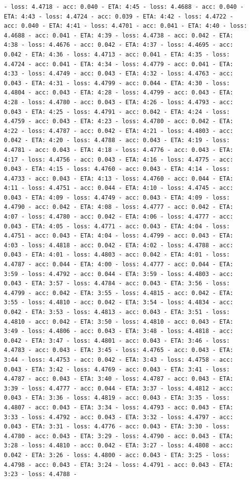 \documentclass[11pt]{article}
\begin{document}
\begin{Verbatim}[commandchars=\\\{\}]
- loss: 4.4718 - acc: 0.040 - ETA: 4:45 - loss: 4.4688 - acc: 0.040 - ETA: 4:43 - loss: 4.4724 - acc: 0.039 - ETA: 4:42 - loss: 4.4722 - acc: 0.040 - ETA: 4:41 - loss: 4.4701 - acc: 0.041 - ETA: 4:40 - loss: 4.4688 - acc: 0.041 - ETA: 4:39 - loss: 4.4738 - acc: 0.042 - ETA: 4:38 - loss: 4.4676 - acc: 0.042 - ETA: 4:37 - loss: 4.4695 - acc: 0.042 - ETA: 4:36 - loss: 4.4713 - acc: 0.041 - ETA: 4:35 - loss: 4.4724 - acc: 0.041 - ETA: 4:34 - loss: 4.4779 - acc: 0.041 - ETA: 4:33 - loss: 4.4749 - acc: 0.043 - ETA: 4:32 - loss: 4.4763 - acc: 0.043 - ETA: 4:31 - loss: 4.4799 - acc: 0.044 - ETA: 4:30 - loss: 4.4804 - acc: 0.043 - ETA: 4:28 - loss: 4.4799 - acc: 0.043 - ETA: 4:28 - loss: 4.4780 - acc: 0.043 - ETA: 4:26 - loss: 4.4793 - acc: 0.043 - ETA: 4:25 - loss: 4.4791 - acc: 0.042 - ETA: 4:24 - loss: 4.4759 - acc: 0.043 - ETA: 4:23 - loss: 4.4780 - acc: 0.042 - ETA: 4:22 - loss: 4.4787 - acc: 0.042 - ETA: 4:21 - loss: 4.4803 - acc: 0.042 - ETA: 4:20 - loss: 4.4788 - acc: 0.043 - ETA: 4:19 - loss: 4.4781 - acc: 0.043 - ETA: 4:18 - loss: 4.4776 - acc: 0.043 - ETA: 4:17 - loss: 4.4756 - acc: 0.043 - ETA: 4:16 - loss: 4.4775 - acc: 0.043 - ETA: 4:15 - loss: 4.4760 - acc: 0.043 - ETA: 4:14 - loss: 4.4733 - acc: 0.043 - ETA: 4:13 - loss: 4.4760 - acc: 0.044 - ETA: 4:11 - loss: 4.4751 - acc: 0.044 - ETA: 4:10 - loss: 4.4745 - acc: 0.043 - ETA: 4:09 - loss: 4.4749 - acc: 0.043 - ETA: 4:09 - loss: 4.4790 - acc: 0.042 - ETA: 4:08 - loss: 4.4777 - acc: 0.042 - ETA: 4:07 - loss: 4.4780 - acc: 0.042 - ETA: 4:06 - loss: 4.4777 - acc: 0.043 - ETA: 4:05 - loss: 4.4771 - acc: 0.043 - ETA: 4:04 - loss: 4.4751 - acc: 0.043 - ETA: 4:04 - loss: 4.4799 - acc: 0.043 - ETA: 4:03 - loss: 4.4818 - acc: 0.042 - ETA: 4:02 - loss: 4.4788 - acc: 0.043 - ETA: 4:01 - loss: 4.4803 - acc: 0.042 - ETA: 4:01 - loss: 4.4787 - acc: 0.044 - ETA: 4:00 - loss: 4.4777 - acc: 0.044 - ETA: 3:59 - loss: 4.4792 - acc: 0.044 - ETA: 3:59 - loss: 4.4803 - acc: 0.043 - ETA: 3:57 - loss: 4.4784 - acc: 0.043 - ETA: 3:56 - loss: 4.4799 - acc: 0.042 - ETA: 3:55 - loss: 4.4815 - acc: 0.042 - ETA: 3:55 - loss: 4.4810 - acc: 0.042 - ETA: 3:54 - loss: 4.4834 - acc: 0.042 - ETA: 3:53 - loss: 4.4813 - acc: 0.043 - ETA: 3:51 - loss: 4.4810 - acc: 0.042 - ETA: 3:50 - loss: 4.4810 - acc: 0.043 - ETA: 3:49 - loss: 4.4806 - acc: 0.043 - ETA: 3:48 - loss: 4.4818 - acc: 0.042 - ETA: 3:47 - loss: 4.4801 - acc: 0.043 - ETA: 3:46 - loss: 4.4783 - acc: 0.043 - ETA: 3:45 - loss: 4.4765 - acc: 0.043 - ETA: 3:44 - loss: 4.4753 - acc: 0.042 - ETA: 3:43 - loss: 4.4758 - acc: 0.043 - ETA: 3:42 - loss: 4.4769 - acc: 0.043 - ETA: 3:41 - loss: 4.4787 - acc: 0.043 - ETA: 3:40 - loss: 4.4787 - acc: 0.043 - ETA: 3:39 - loss: 4.4777 - acc: 0.044 - ETA: 3:37 - loss: 4.4812 - acc: 0.043 - ETA: 3:36 - loss: 4.4819 - acc: 0.043 - ETA: 3:35 - loss: 4.4807 - acc: 0.043 - ETA: 3:34 - loss: 4.4793 - acc: 0.043 - ETA: 3:33 - loss: 4.4792 - acc: 0.043 - ETA: 3:32 - loss: 4.4797 - acc: 0.043 - ETA: 3:31 - loss: 4.4776 - acc: 0.043 - ETA: 3:30 - loss: 4.4780 - acc: 0.043 - ETA: 3:29 - loss: 4.4790 - acc: 0.043 - ETA: 3:28 - loss: 4.4810 - acc: 0.042 - ETA: 3:27 - loss: 4.4808 - acc: 0.042 - ETA: 3:26 - loss: 4.4800 - acc: 0.043 - ETA: 3:25 - loss: 4.4798 - acc: 0.043 - ETA: 3:24 - loss: 4.4791 - acc: 0.043 - ETA: 3:23 - loss: 4.4788 - 
\end{Verbatim}
\end{document}
